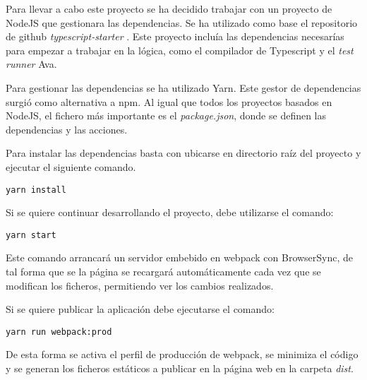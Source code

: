 Para llevar a cabo este proyecto se ha decidido trabajar con un proyecto de NodeJS que gestionara
las dependencias. Se ha utilizado como base el repositorio de github \textit{typescript-starter} \cite{TypescriptStarter}.
Este proyecto incluía las dependencias necesarías para empezar a trabajar en la lógica, como 
el compilador de Typescript y el \textit{test runner} Ava.

\bigskip
Para gestionar las dependencias se ha utilizado Yarn\cite{yarn}. Este gestor de dependencias surgió
como alternativa a npm\cite{npm}. Al igual que todos los proyectos basados en NodeJS, el fichero
más importante es el \textit{package.json}, donde se definen las dependencias y las acciones.

\bigskip
Para instalar las dependencias basta con ubicarse en directorio raíz del proyecto y ejecutar el siguiente
comando.

\begin{lstlisting}
yarn install
\end{lstlisting}

\bigskip
Si se quiere continuar desarrollando el proyecto, debe utilizarse el comando: 
\begin{lstlisting}
yarn start
\end{lstlisting}

Este comando arrancará un servidor embebido en webpack con BrowserSync, de tal forma que se la 
página se recargará automáticamente cada vez que se modifican los ficheros, 
permitiendo ver los cambios realizados.

\bigskip
Si se quiere publicar la aplicación debe ejecutarse el comando:
\begin{lstlisting}
yarn run webpack:prod
\end{lstlisting}

De esta forma se activa el perfil de producción de webpack, se minimiza el código y se generan 
los ficheros estáticos a publicar en la página web en la carpeta \textit{dist}.
